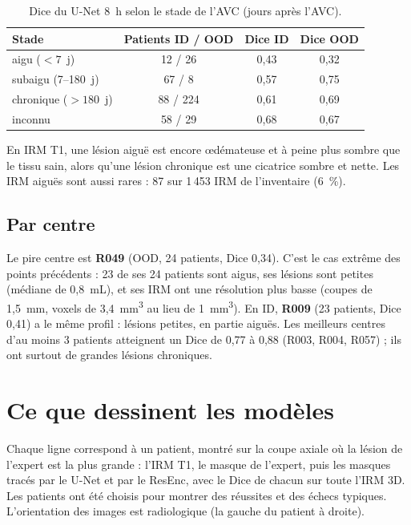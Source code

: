\begin{table}[htbp]
  \centering
  \caption{Dice du U-Net 8~h selon le stade de l'AVC (jours après l'AVC).}
  \label{tab:anas-delai}
  \small
  \begin{tabular}{lccc}
    \toprule
    Stade & Patients ID / OOD & Dice ID & Dice OOD \\
    \midrule
    aigu ($< 7$~j) & 12 / 26 & 0,43 & 0,32 \\
    subaigu (7--180~j) & 67 / 8 & 0,57 & 0,75 \\
    chronique ($> 180$~j) & 88 / 224 & 0,61 & 0,69 \\
    inconnu & 58 / 29 & 0,68 & 0,67 \\
    \bottomrule
  \end{tabular}
\end{table}

En IRM T1, une lésion aiguë est encore œdémateuse et à peine plus sombre que le tissu sain, alors qu'une lésion chronique est une cicatrice sombre et nette.
Les IRM aiguës sont aussi rares : 87 sur 1\,453 IRM de l'inventaire (6~\%).

\subsection{Par centre}

Le pire centre est \textbf{R049} (OOD, 24 patients, Dice 0,34).
C'est le cas extrême des points précédents : 23 de ses 24 patients sont aigus, ses lésions sont petites (médiane de 0,8~mL), et ses IRM ont une résolution plus basse (coupes de 1,5~mm, voxels de 3,4~mm\textsuperscript{3} au lieu de 1~mm\textsuperscript{3}).
En ID, \textbf{R009} (23 patients, Dice 0,41) a le même profil : lésions petites, en partie aiguës.
Les meilleurs centres d'au moins 3 patients atteignent un Dice de 0,77 à 0,88 (R003, R004, R057) ; ils ont surtout de grandes lésions chroniques.

\section{Ce que dessinent les modèles}
\label{sec:anas-exemples}

Chaque ligne correspond à un patient, montré sur la coupe axiale où la lésion de l'expert est la plus grande : l'IRM T1, le masque de l'expert, puis les masques tracés par le U-Net et par le ResEnc, avec le Dice de chacun sur toute l'IRM 3D.
Les patients ont été choisis pour montrer des réussites et des échecs typiques.
L'orientation des images est radiologique (la gauche du patient à droite).

